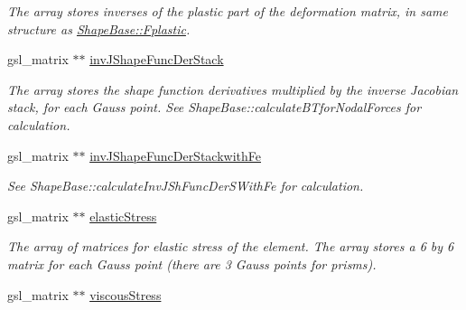 \begin{DoxyCompactItemize}
\begin{DoxyCompactList}\small\item\em The array stores inverses of the plastic part of the deformation matrix, in same structure as \hyperlink{classShapeBase_aa0dbfe70da6938be7304934d80cb0ddf}{Shape\+Base\+::\+Fplastic}. \end{DoxyCompactList}\item 
\hypertarget{classShapeBase_a9478b062928ae554c25cd3269cc9e790}{}gsl\+\_\+matrix $\ast$$\ast$ \hyperlink{classShapeBase_a9478b062928ae554c25cd3269cc9e790}{inv\+J\+Shape\+Func\+Der\+Stack}\label{classShapeBase_a9478b062928ae554c25cd3269cc9e790}

\begin{DoxyCompactList}\small\item\em The array stores the shape function derivatives multiplied by the inverse Jacobian stack, for each Gauss point. See Shape\+Base\+::calculate\+B\+Tfor\+Nodal\+Forces for calculation. \end{DoxyCompactList}\item 
\hypertarget{classShapeBase_a490391c781e50cfc7e2f1a0814bb6d25}{}gsl\+\_\+matrix $\ast$$\ast$ \hyperlink{classShapeBase_a490391c781e50cfc7e2f1a0814bb6d25}{inv\+J\+Shape\+Func\+Der\+Stackwith\+Fe}\label{classShapeBase_a490391c781e50cfc7e2f1a0814bb6d25}

\begin{DoxyCompactList}\small\item\em See Shape\+Base\+::calculate\+Inv\+J\+Sh\+Func\+Der\+S\+With\+Fe for calculation. \end{DoxyCompactList}\item 
\hypertarget{classShapeBase_acd549e0086d16194ae389ae528969596}{}gsl\+\_\+matrix $\ast$$\ast$ \hyperlink{classShapeBase_acd549e0086d16194ae389ae528969596}{elastic\+Stress}\label{classShapeBase_acd549e0086d16194ae389ae528969596}

\begin{DoxyCompactList}\small\item\em The array of matrices for elastic stress of the element. The array stores a 6 by 6 matrix for each Gauss point (there are 3 Gauss points for prisms). \end{DoxyCompactList}\item 
\hypertarget{classShapeBase_a95733061efc2a6645fecfe5c0aa1dd93}{}gsl\+\_\+matrix $\ast$$\ast$ \hyperlink{classShapeBase_a95733061efc2a6645fecfe5c0aa1dd93}{viscous\+Stress}\label{classShapeBase_a95733061efc2a6645fecfe5c0aa1dd93}


\end{DoxyCompactItemize}
